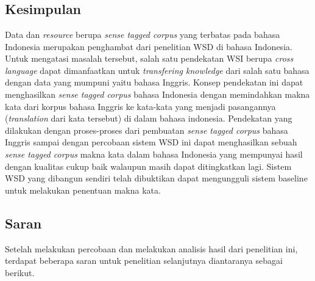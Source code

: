 \chapter{\babEnam}

\section{Kesimpulan}

Data dan \textit{resource} berupa \textit{sense tagged corpus} yang terbatas pada bahasa Indonesia merupakan penghambat dari penelitian WSD di bahasa Indonesia. Untuk mengatasi masalah tersebut, salah satu pendekatan WSI berupa \textit{cross language} dapat dimanfaatkan untuk \textit{transfering knowledge} dari salah satu bahasa dengan data yang mumpuni yaitu bahasa Inggris. Konsep pendekatan ini dapat menghasilkan \textit{sense tagged corpus} bahasa Indonesia dengan memindahkan makna kata dari korpus bahasa Inggris ke kata-kata yang menjadi pasangannya (\textit{translation} dari kata tersebut) di dalam bahasa indonesia. Pendekatan yang dilakukan dengan proses-proses dari pembuatan \textit{sense tagged corpus} bahasa Inggris sampai dengan percobaan sistem WSD ini dapat menghasilkan sebuah \textit{sense tagged corpus} makna kata dalam bahasa Indonesia yang mempunyai hasil dengan kualitas cukup baik walaupun masih dapat ditingkatkan lagi. Sistem WSD yang dibangun sendiri telah dibuktikan dapat mengungguli sistem baseline untuk melakukan penentuan makna kata.
\section{Saran}
Setelah melakukan percobaan dan melakukan analisis hasil dari penelitian ini, terdapat beberapa saran untuk penelitian selanjutnya diantaranya sebagai berikut.

